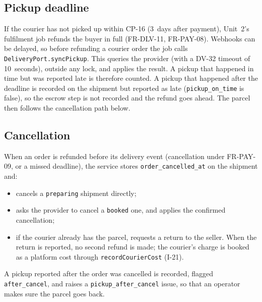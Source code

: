 \documentclass[11pt,a4paper]{article}
\begin{document}
\subsection{Pickup deadline}
If the courier has not picked up within CP-16 (3~days after payment), Unit~2's fulfilment job refunds the buyer in full (FR-DLV-11, FR-PAY-08). Webhooks can be delayed, so before refunding a courier order the job calls \texttt{DeliveryPort.syncPickup}. This queries the provider (with a DV-32 timeout of 10~seconds), outside any lock, and applies the result. A pickup that happened in time but was reported late is therefore counted. A pickup that happened after the deadline is recorded on the shipment but reported as late (\texttt{pickup\_on\_time} is false), so the escrow step is not recorded and the refund goes ahead. The parcel then follows the cancellation path below.

\subsection{Cancellation}
\label{sec:cancel}
When an order is refunded before its delivery event (cancellation under FR-PAY-09, or a missed deadline), the service stores \texttt{order\_cancelled\_at} on the shipment and:
\begin{itemize}[nosep]
  \item cancels a \texttt{preparing} shipment directly;
  \item asks the provider to cancel a \texttt{booked} one, and applies the confirmed cancellation;
  \item if the courier already has the parcel, requests a return to the seller. When the return is reported, no second refund is made; the courier's charge is booked as a platform cost through \texttt{recordCourierCost} (I-21).
\end{itemize}
A pickup reported after the order was cancelled is recorded, flagged \texttt{after\_cancel}, and raises a \texttt{pickup\_after\_cancel} issue, so that an operator makes sure the parcel goes back.
\end{document}
